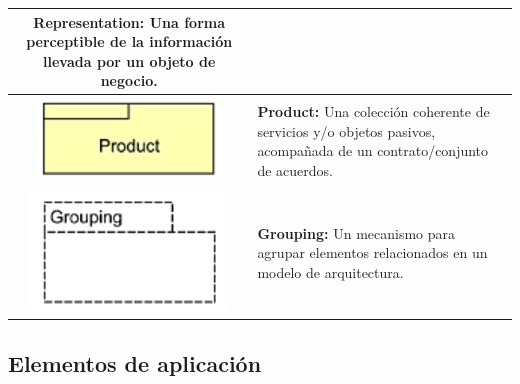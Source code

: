 \begin{longtable}{|c|p{8cm}|}
\textbf{Representation:} Una forma perceptible de la información llevada por un objeto de negocio. \\
\hline
\includegraphics{anexos/ARCHI/business/product.png} & 
\textbf{Product:} Una colección coherente de servicios y/o objetos pasivos, acompañada de un contrato/conjunto de acuerdos. \\
\hline
\includegraphics{anexos/ARCHI/business/grouping.png} &
\textbf{Grouping:} Un mecanismo para agrupar elementos relacionados en un modelo de arquitectura. \\
\end{longtable}

\subsection{Elementos de aplicación}

